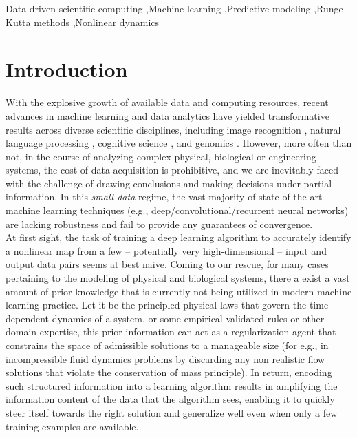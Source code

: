 \documentclass[preprint,12pt]{elsarticle}
\begin{document}
\begin{frontmatter}
\begin{abstract}
\end{abstract}

\begin{keyword}
Data-driven scientific computing \sep Machine learning \sep Predictive modeling \sep Runge-Kutta methods \sep Nonlinear dynamics


\end{keyword}


\end{frontmatter}


\section{Introduction}

With the explosive growth of available data and computing resources, recent advances in machine learning and data analytics have yielded transformative results across diverse scientific disciplines, including image recognition \cite{krizhevsky2012imagenet}, natural language processing \cite{lecun2015deep}, cognitive science \cite{lake2015human}, and genomics \cite{alipanahi2015predicting}. However, more often than not, in the course of analyzing complex physical, biological or engineering systems, the cost of data acquisition is prohibitive, and we are inevitably faced with the challenge of drawing conclusions and making decisions under partial information. In this {\em small data} regime, the vast majority of state-of-the art machine learning techniques (e.g., deep/convolutional/recurrent neural networks) are lacking robustness and fail to provide any guarantees of convergence.\\

At first sight, the task of training a deep learning algorithm to accurately identify a nonlinear map from a few -- potentially very high-dimensional -- input and output data pairs seems at best naive. Coming to our rescue, for many cases pertaining to the modeling of physical and biological systems, there a exist a vast amount of prior knowledge that is currently not being utilized in modern machine learning practice. Let it be the principled physical laws that govern the time-dependent dynamics of a system, or some empirical validated rules or other domain expertise, this prior information can act as a regularization agent that constrains the space of admissible solutions to a manageable size (for e.g., in incompressible fluid dynamics problems by discarding any non realistic flow solutions that violate the conservation of mass principle). In return, encoding such structured information into a learning algorithm results in amplifying the information content of the data that the algorithm sees, enabling it to quickly steer itself towards the right solution and generalize well even when only a few training examples are available.\\
\end{document}
